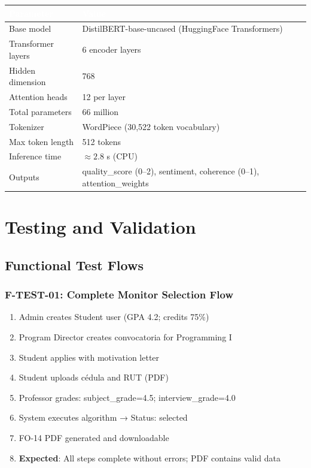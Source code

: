 \documentclass[12pt,a4paper,twoside]{report}
\begin{document}
\begin{center}
\begin{tabularx}{\textwidth}{|l|X|}
\hline
\rowcolor{tableHdr}\textcolor{white}{\textbf{Parameter}} & \textcolor{white}{\textbf{Value}} \\
\hline
\rowcolor{rowOdd}Base model & DistilBERT-base-uncased (HuggingFace Transformers) \\
\hline\rowcolor{rowEven}Transformer layers & 6 encoder layers \\
\hline\rowcolor{rowOdd}Hidden dimension & 768 \\
\hline\rowcolor{rowEven}Attention heads & 12 per layer \\
\hline\rowcolor{rowOdd}Total parameters & 66 million \\
\hline\rowcolor{rowEven}Tokenizer & WordPiece (30,522 token vocabulary) \\
\hline\rowcolor{rowOdd}Max token length & 512 tokens \\
\hline\rowcolor{rowEven}Inference time & $\approx 2.8$ s (CPU) \\
\hline\rowcolor{rowOdd}Outputs & quality\_score (0--2), sentiment, coherence (0--1), attention\_weights \\
\hline
\end{tabularx}
\end{center}

\chapter{Testing and Validation}

\section{Functional Test Flows}

\subsection{F-TEST-01: Complete Monitor Selection Flow}
\begin{enumerate}[leftmargin=*]
\item Admin creates Student user (GPA 4.2; credits 75\%)
\item Program Director creates convocatoria for Programming I
\item Student applies with motivation letter
\item Student uploads cédula and RUT (PDF)
\item Professor grades: subject\_grade=4.5; interview\_grade=4.0
\item System executes algorithm → Status: selected
\item FO-14 PDF generated and downloadable
\item \textbf{Expected}: All steps complete without errors; PDF contains valid data
\end{enumerate}
\end{document}
